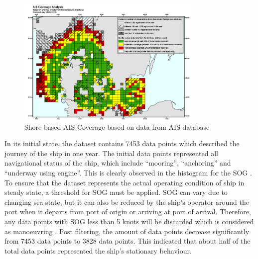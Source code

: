 \begin{figure}
    \centering
        \includegraphics[width=0.8\textwidth]{02_figures/AIS_Coverage.png}
        \caption{Shore based AIS Coverage based on data from AIS database \cite{webaisdk.2023}}
        \label{fig:aiscoverage}
\end{figure}

In its initial state, the dataset contains 7453 data points which described the journey of the ship in one year. The initial data points represented all navigational status of the ship, which include ``mooring'', ``anchoring'' and ``underway using engine''. This is clearly observed in the histogram for the SOG .\\ 

To ensure that the dataset represents the actual operating condition of ship in steady state, a threshold for SOG must be applied. SOG can vary due to changing sea state, but it can also be reduced by the ship's operator around the port when it departs from port of origin or arriving at port of arrival. Therefore, any data points with SOG less than 5 knots will be discarded which is considered as manoeuvring . Post filtering, the amount of data points decrease significantly from 7453 data points to 3828 data points. This indicated that about half of the total data points represented the ship's stationary behaviour.\\

